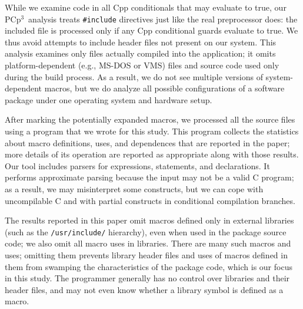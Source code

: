 \documentclass[10pt]{article}
\newcommand{\pcp}{\mbox{\textsf{PCp}$^3$}}
\newcommand{\file}[1]{\texttt{#1}}
\begin{document}
While we examine code in all Cpp conditionals that may evaluate to true,
our \pcp\ analysis treats {\tt \#include} directives just like the real
preprocessor does:  the included file is processed only if any Cpp
conditional guards evaluate to true.  We thus avoid attempts to include
header files not present on our system.  This analysis examines only files
actually compiled into the application; it omits platform-dependent
(e.g., MS-DOS or VMS) files and source code used only during the build
process.  As a result, we do not see multiple versions of system-dependent
macros, but we do analyze all possible configurations of a software package
under one operating system and hardware setup.







After marking the potentially expanded macros, we processed all the source
files using a program that we wrote for this study.  This program collects the
statistics about macro definitions, uses, and dependences that are
reported in the paper; more details of its operation are reported as
appropriate along with those results.  Our tool includes parsers for
expressions, statements, and declarations.  It performs approximate parsing
because the input may not be a valid C program; as a result, we may
misinterpret some constructs, but we can cope with uncompilable C and with
partial constructs in conditional compilation branches.

The results reported in this paper omit macros defined only in external
libraries (such as the \file{/usr/include/} hierarchy), even when used in
the package source code; we also omit all macro uses in libraries.  
There are many such macros and uses; omitting them
prevents library header files and uses of macros defined in them from
swamping the characteristics of the
package code, which is our focus in this study.  The programmer generally
has no control over libraries and their header files, and may not even know
whether a library symbol is defined as a macro.
\end{document}
